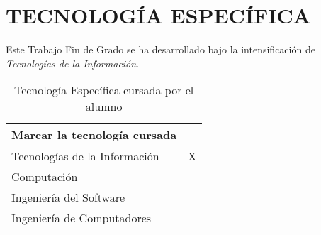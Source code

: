 \documentclass{pre-tfg}
\begin{document}
\newpage

\section{TECNOLOGÍA ESPECÍFICA}
Este Trabajo Fin de Grado se ha desarrollado bajo la intensificación de \textit{Tecnologías de la Información}.

\begin{table}[hp]
	\centering
	\caption{Tecnología Específica cursada por el alumno}
	\label{tab:tec-especifica}
	
	
	\begin{tabular}{p{}p{}}
		\textbf{Marcar la tecnología cursada} \\
		\hline
			Tecnologías de la Información & X\\
			Computación & \\
			Ingeniería del Software & \\
			Ingeniería de Computadores & \\
		\hline
	\end{tabular}

\end{table}
\end{document}
